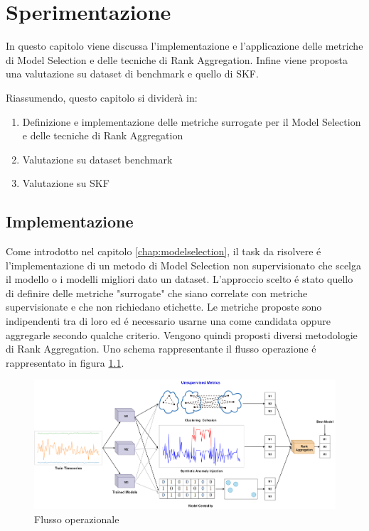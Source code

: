 \chapter{Sperimentazione}
\label{chap:impl}

In questo capitolo viene discussa l'implementazione e l'applicazione delle metriche di Model Selection e delle tecniche di Rank Aggregation. Infine viene proposta una valutazione su dataset di benchmark e quello di SKF.

Riassumendo, questo capitolo si dividerà in:
\begin{enumerate}
	\item Definizione e implementazione delle metriche surrogate per il Model Selection e delle tecniche di Rank Aggregation
	\item Valutazione su dataset benchmark
	\item Valutazione su SKF
\end{enumerate}


\section{Implementazione}
Come introdotto nel capitolo \ref{chap:modelselection}, il task da risolvere é l'implementazione di un metodo di Model Selection non supervisionato che scelga il modello o i modelli migliori dato un dataset. L'approccio scelto é stato quello di definire delle metriche "surrogate" che siano correlate con metriche supervisionate e che non richiedano etichette. Le metriche proposte sono indipendenti tra di loro ed é necessario usarne una come candidata oppure aggregarle secondo qualche criterio. Vengono quindi proposti diversi metodologie di Rank Aggregation. Uno schema rappresentante il flusso operazione é rappresentato in figura \ref{flow-scheme}.
\begin{figure}[t]
	\centering
	\includegraphics[width=14cm, scale=1]{images/model-selection-scheme}
	\caption{Flusso operazionale}
	\label{flow-scheme}
		
\end{figure}

